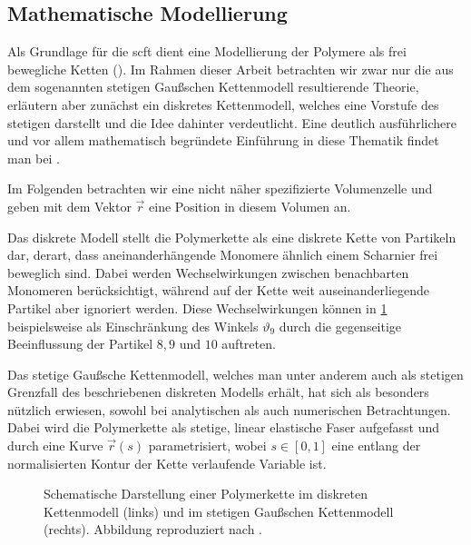 \subsection*{Mathematische Modellierung} %

Als Grundlage für die \acl{scft} dient eine Modellierung der Polymere als frei bewegliche Ketten ().
Im Rahmen dieser Arbeit betrachten wir zwar nur die aus dem sogenannten stetigen Gaußschen Kettenmodell resultierende Theorie, erläutern aber zunächst ein diskretes Kettenmodell, welches eine Vorstufe des stetigen darstellt und die Idee dahinter verdeutlicht.
Eine deutlich ausführlichere und vor allem mathematisch begründete Einführung in diese Thematik findet man bei \textcites[Chapter 2]{Fredrickson:2006th}{rubinstein2003polymer}.

Im Folgenden betrachten wir eine nicht näher spezifizierte Volumenzelle und geben mit dem Vektor $\vec{r}$ eine Position in diesem Volumen an.

Das diskrete Modell stellt die Polymerkette als eine diskrete Kette von Partikeln dar, derart, dass aneinanderhängende Monomere ähnlich einem Scharnier frei beweglich sind.
Dabei werden Wechselwirkungen zwischen benachbarten Monomeren berücksichtigt, während auf der Kette weit auseinanderliegende Partikel aber ignoriert werden.
Diese Wechselwirkungen können in \cref{figure:kettenmodelle} beispielsweise als Einschränkung des Winkels $\vartheta_9$ durch die gegenseitige Beeinflussung der Partikel $8, 9$ und $10$ auftreten.

Das stetige Gaußsche Kettenmodell, welches man unter anderem auch als stetigen Grenzfall des beschriebenen diskreten Modells erhält, hat sich als besonders nützlich erwiesen, sowohl bei analytischen als auch numerischen Betrachtungen.
Dabei wird die Polymerkette als stetige, linear elastische Faser aufgefasst und durch eine Kurve $\vec{r}(s)$ parametrisiert, wobei $s \in [0, 1]$ eine entlang der normalisierten Kontur der Kette verlaufende Variable ist.

\begin{figure}[tb]
    \centering
        
    \caption[%
        Polymerkette in diskretem und Gaußschen Kettenmodell
    ]{%
        Schematische Darstellung einer Polymerkette im diskreten Kettenmodell (links) und im stetigen Gaußschen Kettenmodell (rechts).
        Abbildung reproduziert nach \cite[Figure 2.1 und 2.5]{Fredrickson:2006th}.
    }
    \label{figure:kettenmodelle}
\end{figure}

